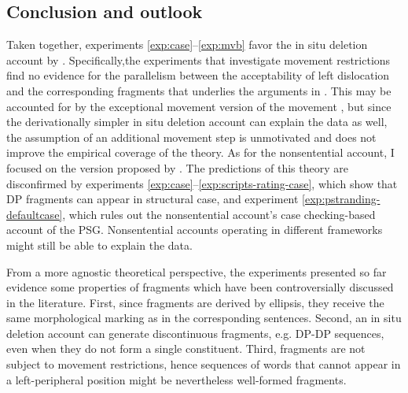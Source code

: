 \subsection{Conclusion and outlook}\largerpage

Taken together, experiments \ref{exp:case}--\ref{exp:mvb} favor the in situ deletion account by \citet{reich2007}. Specifically,the experiments that investigate movement restrictions find no evidence for the parallelism between the acceptability of left dislocation and the corresponding fragments that underlies the arguments in \citet{merchant2004}. This may be accounted for by the exceptional movement version of the movement \citep{weir2014}, but since the derivationally simpler in situ deletion account can explain the data as well, the assumption of an additional movement step is unmotivated and does not improve the empirical coverage of the theory. As for the nonsentential account, I focused on the version proposed by \citet{barton.progovac2005}. The predictions of this theory are disconfirmed by experiments \ref{exp:case}--\ref{exp:scripts-rating-case}, which show that DP fragments can appear in structural case, and experiment \ref{exp:pstranding-defaultcase}, which rules out the nonsentential account's case checking-based account of the PSG. Nonsentential accounts operating in different frameworks \citep[e.g.][]{ginzburg.sag2000, fernandez.ginzburg2002, culicover.jackendoff2005} might still be able to explain the data.

From a more agnostic theoretical perspective, the experiments presented so far evidence some properties of fragments which have been controversially discussed in the literature. First, since fragments are derived by ellipsis, they receive the same morphological marking as in the corresponding sentences. Second, an in situ deletion account can generate discontinuous fragments, e.g. DP-DP sequences, even when they do not form a single constituent. Third, fragments are not subject to movement restrictions, hence sequences of words that cannot appear in a left-peripheral position might be nevertheless well-formed fragments. 

